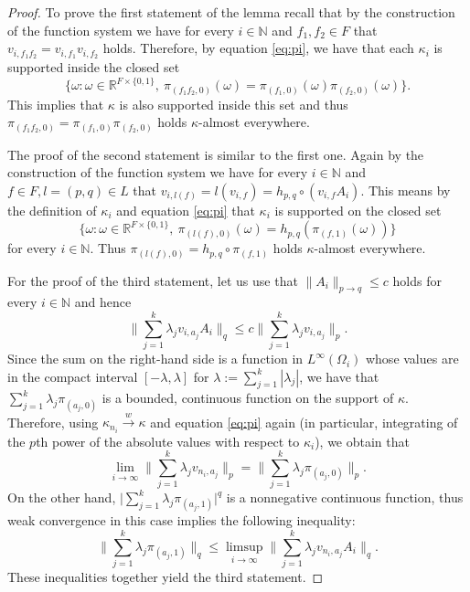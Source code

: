 \documentclass[a4wider]{amsart}
\theoremstyle{definitionbreak}\newtheorem{D}[theorem]{Definition}
\theoremstyle{definitionbreak}\newtheorem*{D*}{Definition}
\begin{document}
\begin{proof}
To prove the first statement of the lemma recall that by the construction of the function system we have for every $i\in\mathbb{N}$ and $f_1,f_2\in F$ that $v_{i,f_1f_2}=v_{i,f_1}v_{i,f_2}$ holds.  Therefore, by equation \eqref{eq:pi}, we have that each $\kappa_i$  is supported inside the closed set $$\big\{\omega: \omega\in\mathbb{R}^{F\times\{0,1\}},~\pi_{(f_1f_2,0)}(\omega)=\pi_{(f_1,0)}(\omega)\pi_{(f_2,0)}(\omega)\big\}.$$ This implies that $\kappa$ is also supported inside this set and thus $\pi_{(f_1f_2,0)}=\pi_{(f_1,0)}\pi_{(f_2,0)}$ holds $\kappa$-almost everywhere. 

The proof of the second statement is similar to the first one. Again by the construction of the function system we have for every $i\in\mathbb{N}$ and $f\in F,l=(p,q)\in L$ that $v_{i,l(f)}=l(v_{i,f})=h_{p,q}\circ (v_{i,f} A_i)$. This means by the definition of $\kappa_i$ and equation \eqref{eq:pi} that $\kappa_i$ is supported on the closed set
$$\big\{\omega: \omega\in\mathbb{R}^{F\times\{0,1\}},~\pi_{(l(f),0)}(\omega)=h_{p,q}(\pi_{(f,1)}(\omega))\big\}$$ for every $i\in\mathbb{N}$. Thus $\pi_{(l(f),0)}=h_{p,q}\circ\pi_{(f,1)}$ holds $\kappa$-almost everywhere.

For the proof of the third statement, let us use that $\|A_i\|_{p\to q}\leq c$ holds for every $i\in\mathbb{N}$ and hence
$$\Big\|\sum_{j=1}^k \lambda_j v_{i,a_j}A_i\Big\|_q\leq c\Big\|\sum_{j=1}^k \lambda_j v_{i,a_j}\Big\|_p .$$ 
Since the sum on the right-hand side is a function in $L^\infty(\Omega_i)$ whose values are in the compact interval $[-\lambda,\lambda]$ for $\lambda:=\sum_{j=1}^k |\lambda_j|$,  we have that $\sum_{j=1}^k \lambda_j \pi_{(a_j,0)}$ is a bounded, continuous function on the support of $\kappa$. Therefore, using $\kappa_{n_i}\stackrel{w}\rightarrow \kappa$ and  equation \eqref{eq:pi} again (in particular, integrating of the $p$th power of the absolute values with respect to $\kappa_i$), we obtain that  
$$\lim_{i\to\infty}\Big\|\sum_{j=1}^k \lambda_j v_{n_i,a_j}\Big\|_p=\Big\|\sum_{j=1}^k \lambda_j \pi_{(a_j,0)}\Big\|_p.$$
On the other hand, $\big|\sum_{j=1}^k \lambda_j \pi_{(a_j,1)}|^q$ is a nonnegative continuous function, thus weak convergence in this case implies the following inequality: 
$$\Big\|\sum_{j=1}^k \lambda_j \pi_{(a_j,1)}\Big\|_q\leq\limsup_{i\to\infty}\Big\|\sum_{j=1}^k \lambda_j v_{n_i,a_j}A_i\Big\|_q.$$ These inequalities together yield the third statement.


\end{proof}
\end{document}
